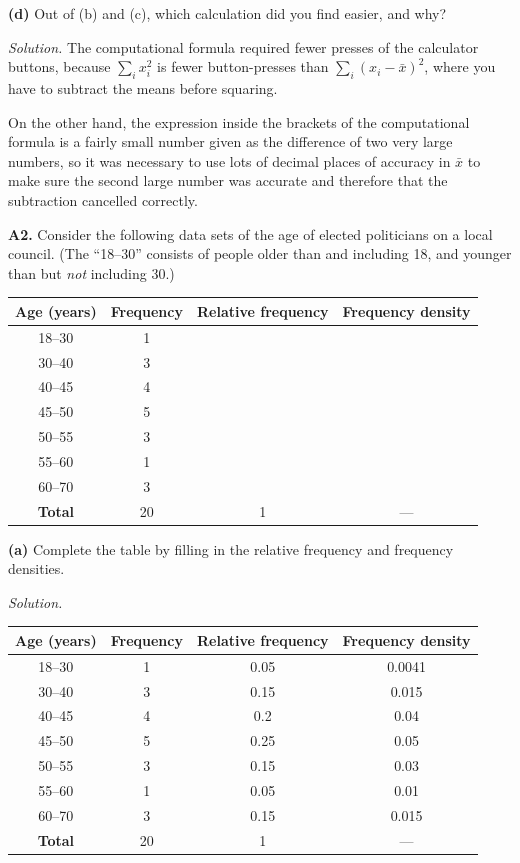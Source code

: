 \documentclass[
  a4paper,
]{book}
\theoremstyle{definition}
\theoremstyle{definition}
\theoremstyle{definition}
\theoremstyle{definition}
\theoremstyle{remark}
\begin{document}
\textbf{(d)} Out of (b) and (c), which calculation did you find easier, and why?

\begin{myanswers}
\emph{Solution.}
The computational formula required fewer presses of the calculator buttons, because \(\sum_i x_i^2\) is fewer button-presses than \(\sum_i (x_i - \bar x)^2\), where you have to subtract the means before squaring.

On the other hand, the expression inside the brackets of the computational formula is a fairly small number given as the difference of two very large numbers, so it was necessary to use lots of decimal places of accuracy in \(\bar x\) to make sure the second large number was accurate and therefore that the subtraction cancelled correctly.

\end{myanswers}

\textbf{A2.} Consider the following data sets of the age of elected politicians on a local council. (The ``18--30'' consists of people older than and including 18, and younger than but \emph{not} including 30.)

\begin{longtable}[]{@{}cccc@{}}
\toprule
Age (years) & Frequency & Relative frequency & Frequency density \\
\midrule
\endhead
18--30 & 1 & & \\
30--40 & 3 & & \\
40--45 & 4 & & \\
45--50 & 5 & & \\
50--55 & 3 & & \\
55--60 & 1 & & \\
60--70 & 3 & & \\
\textbf{Total} & 20 & 1 & --- \\
\bottomrule
\end{longtable}

\textbf{(a)} Complete the table by filling in the relative frequency and frequency densities.

\begin{myanswers}

\emph{Solution.}

\begin{longtable}[]{@{}cccc@{}}
\toprule
Age (years) & Frequency & Relative frequency & Frequency density \\
\midrule
\endhead
18--30 & 1 & 0.05 & 0.0041 \\
30--40 & 3 & 0.15 & 0.015 \\
40--45 & 4 & 0.2 & 0.04 \\
45--50 & 5 & 0.25 & 0.05 \\
50--55 & 3 & 0.15 & 0.03 \\
55--60 & 1 & 0.05 & 0.01 \\
60--70 & 3 & 0.15 & 0.015 \\
\textbf{Total} & 20 & 1 & --- \\
\bottomrule
\end{longtable}

\end{myanswers}
\end{document}
